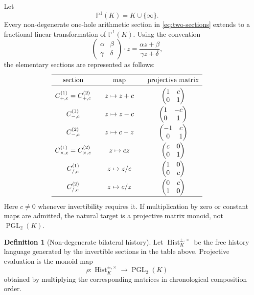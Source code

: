 \documentclass[11pt]{article}
\theoremstyle{definition}
\newtheorem{definition}[theorem]{Definition}
\theoremstyle{remark}
\newcommand{\PGL}{\operatorname{PGL}}
\newcommand{\Hist}{\operatorname{Hist}}
\newcommand{\PP}{\mathbb P}
\begin{document}
Let
\[
\PP^1(K)=K\cup\{\infty\}.
\]
Every non-degenerate one-hole arithmetic section in
\eqref{eq:two-sections} extends to a fractional linear transformation of
\(\PP^1(K)\).  Using the convention
\[
\begin{pmatrix}\alpha&\beta\\ \gamma&\delta\end{pmatrix}\cdot z
=\frac{\alpha z+\beta}{\gamma z+\delta},
\]
the elementary sections are represented as follows:
\[
\begin{array}{c@{\qquad}c@{\qquad}c}
\toprule
\text{section} & \text{map} & \text{projective matrix}\\
\midrule
C^{(1)}_{+,c}=C^{(2)}_{+,c}
& z\mapsto z+c
& \begin{pmatrix}1&c\\0&1\end{pmatrix}\\[3mm]
C^{(1)}_{-,c}
& z\mapsto z-c
& \begin{pmatrix}1&-c\\0&1\end{pmatrix}\\[3mm]
C^{(2)}_{-,c}
& z\mapsto c-z
& \begin{pmatrix}-1&c\\0&1\end{pmatrix}\\[3mm]
C^{(1)}_{\times,c}=C^{(2)}_{\times,c}
& z\mapsto cz
& \begin{pmatrix}c&0\\0&1\end{pmatrix}\\[3mm]
C^{(1)}_{/,c}
& z\mapsto z/c
& \begin{pmatrix}1&0\\0&c\end{pmatrix}\\[3mm]
C^{(2)}_{/,c}
& z\mapsto c/z
& \begin{pmatrix}0&c\\1&0\end{pmatrix}\\
\bottomrule
\end{array}
\]
Here \(c\neq0\) whenever invertibility requires it.  If multiplication by zero
or constant maps are admitted, the natural target is a projective matrix
monoid, not \(\PGL_2(K)\).

\begin{definition}[Non-degenerate bilateral history]
Let \(\Hist_K^{\pm,\times}\) be the free history language generated by the
invertible sections in the table above.  Projective evaluation is the monoid
map
\[
\rho:\Hist_K^{\pm,\times}\longrightarrow\PGL_2(K)
\]
obtained by multiplying the corresponding matrices in chronological
composition order.
\end{definition}
\end{document}
